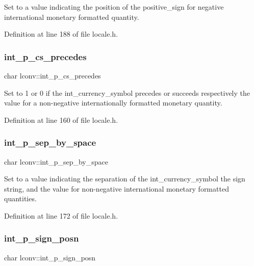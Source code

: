 Set to a value indicating the position of the positive\+\_\+sign for negative international monetary formatted quantity. 



Definition at line 188 of file locale.\+h.

\mbox{\label{structlconv_a1a78cbc82f07601c2acb643f8dffdf64}} 
\subsubsection{\texorpdfstring{int\_p\_cs\_precedes}{int\_p\_cs\_precedes}}
{\footnotesize\ttfamily char lconv\+::int\+\_\+p\+\_\+cs\+\_\+precedes}



Set to 1 or 0 if the int\+\_\+currency\+\_\+symbol precedes or succeeds respectively the value for a non-\/negative internationally formatted monetary quantity. 



Definition at line 160 of file locale.\+h.

\mbox{\label{structlconv_ae77e798ef92e86d58100b16fb8163443}} 
\subsubsection{\texorpdfstring{int\_p\_sep\_by\_space}{int\_p\_sep\_by\_space}}
{\footnotesize\ttfamily char lconv\+::int\+\_\+p\+\_\+sep\+\_\+by\+\_\+space}



Set to a value indicating the separation of the int\+\_\+currency\+\_\+symbol the sign string, and the value for non-\/negative international monetary formatted quantities. 



Definition at line 172 of file locale.\+h.

\mbox{\label{structlconv_a266ed42f4bb087d1efac551940c42f6f}} 
\subsubsection{\texorpdfstring{int\_p\_sign\_posn}{int\_p\_sign\_posn}}
{\footnotesize\ttfamily char lconv\+::int\+\_\+p\+\_\+sign\+\_\+posn}



